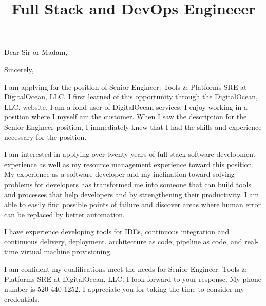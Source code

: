\documentclass[11pt,a4paper,sans]{moderncv}        %
\title{Full Stack and DevOps Engineeer}                               %
\begin{document}
\opening{Dear Sir or Madam,}
\closing{Sincerely,}
\makelettertitle


I am applying for the position of Senior Engineer: Tools & Platforms SRE at DigitalOcean, LLC. I first learned of this opportunity through the DigitalOcean, LLC. website. 
I am a fond user of DigitalOcean services. I enjoy working in a position where I myself am the customer. When I saw the description for the Senior Engineer position, I immediately
knew that I had the skills and experience necessary for the position.

I am interested in applying over twenty years of full-stack software development experience as well as my resource management experience toward this position. My experience as a 
software developer and my inclination toward solving problems for developers has transformed me into someone that can build tools and processes that help developers and by strengthening 
their productivity. I am able to easily find possible points of failure and discover areas where human error can be replaced by better automation.

I have experience developing tools for IDEs, continuous integration and continuous delivery, deployment, architecture as code, pipeline as code, and real-time virtual machine provisioning. 

I am confident my qualifications meet the needs for Senior Engineer: Tools & Platforms SRE at DigitalOcean, LLC. I look forward to your response. My phone number is 520-440-1252.
I appreciate you for taking the time to consider my credentials.



\makeletterclosing
\end{document}
